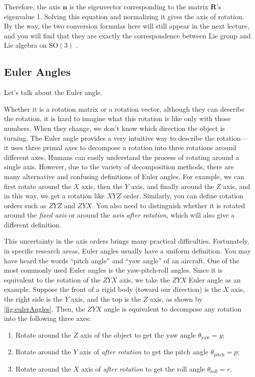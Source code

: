 Therefore, the axis $ \mathbf{n} $ is the eigenvector corresponding to the matrix $ \mathbf{R}$'s eigenvalue 1. Solving this equation and normalizing it gives the axis of rotation. By the way, the two conversion formulas here will still appear in the next lecture, and you will find that they are exactly the correspondence between Lie group and Lie algebra on $ \mathrm{SO}(3) $ .

\subsection{Euler Angles}
Let's talk about the Euler angle.

Whether it is a rotation matrix or a rotation vector, although they can describe the rotation, it is hard to imagine what this rotation is like only with those numbers. When they change, we don't know which direction the object is turning. The Euler angle provides a very intuitive way to describe the rotation—it uses three primal axes to decompose a rotation into three rotations around different axes. Humans can easily understand the process of rotating around a single axis. However, due to the variety of decomposition methods, there are many alternative and confusing definitions of Euler angles. For example, we can first rotate around the $X$ axis, then the $Y$ axis, and finally around the $Z$ axis, and in this way, we get a rotation like $XYZ$ order. Similarly, you can define rotation orders such as $ZYZ$ and $ZYX$. You also need to distinguish whether it is rotated around the \textit{fixed axis} or around the \textit{axis after rotation}, which will also give a different definition.

This uncertainty in the axis orders brings many practical difficulties. Fortunately, in specific research areas, Euler angles usually have a uniform definition. You may have heard the words ``pitch angle'' and ``yaw angle'' of an aircraft. One of the most commonly used Euler angles is the yaw-pitch-roll angles. Since it is equivalent to the rotation of the $ZYX$ axis, we take the $ZYX$ Euler angle as an example. Suppose the front of a rigid body (toward our direction) is the $X$ axis, the right side is the $Y$ axis, and the top is the $Z$ axis, as shown by \autoref{fig:eulerAngles}. Then, the $ZYX$ angle is equivalent to decompose any rotation into the following three axes:

\begin{enumerate}
    \item Rotate around the $Z$ axis of the object to get the yaw angle $\theta_{\mathrm{yaw}}=y$;
    \item Rotate around the $Y$ axis of \textit{after rotation} to get the pitch angle $\theta_{\mathrm{pitch}}=p$;
    \item Rotate around the $X$ axis of \textit{after rotation} to get the roll angle $\theta_{\mathrm{roll}}=r$.
\end{enumerate}

